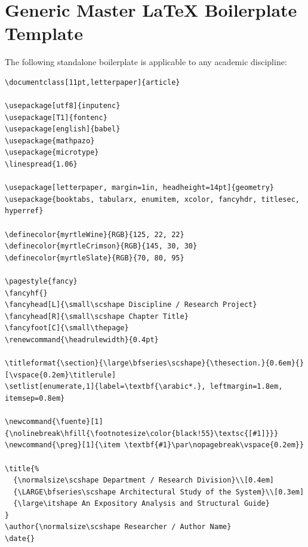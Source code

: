 \documentclass[11pt,letterpaper]{article}
\renewcommand{\headrulewidth}{0.4pt}
\begin{document}
\section{Generic Master \LaTeX{} Boilerplate Template}

The following standalone boilerplate is applicable to any academic discipline:

\begin{lstlisting}
\documentclass[11pt,letterpaper]{article}

\usepackage[utf8]{inputenc}
\usepackage[T1]{fontenc}
\usepackage[english]{babel}
\usepackage{mathpazo}
\usepackage{microtype}
\linespread{1.06}

\usepackage[letterpaper, margin=1in, headheight=14pt]{geometry}
\usepackage{booktabs, tabularx, enumitem, xcolor, fancyhdr, titlesec, hyperref}

\definecolor{myrtleWine}{RGB}{125, 22, 22}
\definecolor{myrtleCrimson}{RGB}{145, 30, 30}
\definecolor{myrtleSlate}{RGB}{70, 80, 95}

\pagestyle{fancy}
\fancyhf{}
\fancyhead[L]{\small\scshape Discipline / Research Project}
\fancyhead[R]{\small\scshape Chapter Title}
\fancyfoot[C]{\small\thepage}
\renewcommand{\headrulewidth}{0.4pt}

\titleformat{\section}{\large\bfseries\scshape}{\thesection.}{0.6em}{}[\vspace{0.2em}\titlerule]
\setlist[enumerate,1]{label=\textbf{\arabic*.}, leftmargin=1.8em, itemsep=0.8em}

\newcommand{\fuente}[1]{\nolinebreak\hfill{\footnotesize\color{black!55}\textsc{[#1]}}}
\newcommand{\preg}[1]{\item \textbf{#1}\par\nopagebreak\vspace{0.2em}}

\title{%
  {\normalsize\scshape Department / Research Division}\\[0.4em]
  {\LARGE\bfseries\scshape Architectural Study of the System}\\[0.3em]
  {\large\itshape An Expository Analysis and Structural Guide}
}
\author{\normalsize\scshape Researcher / Author Name}
\date{}


\end{lstlisting}
\end{document}
